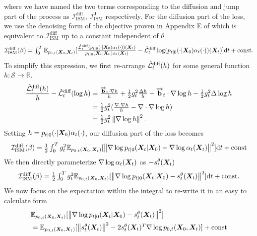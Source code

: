where we have named the two terms corresponding to the diffusion and jump part of the process as $\mathcal{I}_{\text{ISM}}^{\text{diff}}$, $\mathcal{I}_{\text{ISM}}^{\text{J}}$ respectively. For the diffusion part of the loss, we use the denoising form of the objective proven in Appendix E of \cite{benton2022denoising} which is equivalent to $\mathcal{I}_{\text{ISM}}^{\text{diff}}$ up to a constant independent of $\theta$
\begin{equation}
  \textstyle 
    \mathcal{I}_{\text{ISM}}^{\text{diff}}(\beta) = \int_{0}^T \mathbb{E}_{p_{0, t}({\bm{X}}_0, {\bm{X}}_t)} [ \frac{\hat{\mathcal{L}}^{\text{diff}}_t ( p_{t|0}( \cdot | {\bm{X}}_0) \alpha_t(\cdot))({\bm{X}}_t)}{p_{t|0}({\bm{X}}_t | {\bm{X}}_0) \alpha_t({\bm{X}}_t) } - \hat{\mathcal{L}}^{\text{diff}}_t \log ( p_{t|0}(\cdot | {\bm{X}}_0) \alpha_t(\cdot) ) ({\bm{X}}_t) ] \mathrm{d} t + \text{const} .
\end{equation}
To simplify this expression, we first re-arrange $\hat{\mathcal{L}}^{\text{diff}}_t(h)$ for some general function $h : \mathcal{S} \rightarrow \mathbb{R}$.
\begin{align}
    \frac{\hat{\mathcal{L}}^{\text{diff}}_t(h)}{h} - \hat{\mathcal{L}}^{\text{diff}}_t(\log h) &\textstyle  = \frac{\overrightarrow{\mathbf{b}}_t \cdot \nabla h}{h} + \frac{1}{2} g_t^2 \frac{\Delta h}{h} - \overrightarrow{\mathbf{b}}_t \cdot \nabla \log h - \frac{1}{2} g_t^2 \Delta \log h \\
    &\textstyle = \frac{1}{2} g_t^2 ( \frac{\nabla \cdot \nabla h}{h} - \nabla \cdot \nabla \log h ) \\
    &\textstyle = \frac{1}{2} g_t^2 \left\lVert\nabla \log h\right\rVert^2 . 
\end{align}
Setting $h = p_{t|0}(\cdot | {\bm{X}}_0) \alpha_t(\cdot)$, our diffusion part of the loss becomes
\begin{equation}
  \textstyle 
    \mathcal{I}_{\text{ISM}}^{\text{diff}}(\beta) = \frac{1}{2} \int_{0}^T g_t^2 \mathbb{E}_{p_{0, t}({\bm{X}}_0, {\bm{X}}_t) } [ \left\lVert \nabla \log p_{t|0}({\bm{X}}_t | {\bm{X}}_0) + \nabla \log \alpha_t({\bm{X}}_t) \right\rVert^2 ] \mathrm{d} t + \text{const}
\end{equation}
We then directly parameterize $\nabla \log \alpha_t({\bm{X}}_t)$ as $- s_t^\theta({\bm{X}}_t)$
\begin{equation}
  \textstyle 
    \mathcal{I}_{\text{ISM}}^{\text{diff}}(\beta) = \frac{1}{2} \int_{0}^T g_t^2 \mathbb{E}_{p_{0, t}({\bm{X}}_0, {\bm{X}}_t) } [ \left\lVert \nabla \log p_{t|0}({\bm{X}}_t | {\bm{X}}_0) - s_t^\theta({\bm{X}}_t) \right\rVert^2 ] \mathrm{d} t + \text{const} .
\end{equation}
We now focus on the expectation within the integral to re-write it in an easy to calculate form
\begin{align}
    &\textstyle \mathbb{E}_{p_{0, t}({\bm{X}}_0, {\bm{X}}_t) } [ \left\lVert \nabla \log p_{t|0}({\bm{X}}_t | {\bm{X}}_0) - s_t^\theta({\bm{X}}_t) \right\rVert^2 ] \\
    &\textstyle = \mathbb{E}_{p_{0,t}({\bm{X}}_0, {\bm{X}}_t)} [ \left\lVert s_t^\theta({\bm{X}}_t)\right\rVert^2 - 2 s_t^\theta({\bm{X}}_t)^T \nabla \log p_{0,t}({\bm{X}}_0, {\bm{X}}_t) ] + \text{const}
\end{align}
